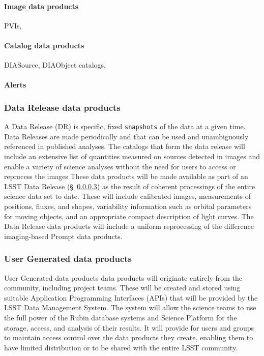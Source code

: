\paragraph {Image data products}  PVIs,
\paragraph {Catalog data products}  DIASource, DIAObject catalogs,
\paragraph {Alerts}


\subsubsection{Data Release data products} \label{sec:dp-release}
A Data Release (DR) is specific, fixed {\tt snapshots} of the data at a given time.
Data Releases are made periodically and that can be used and
unambiguously referenced in published analyses.
The catalogs that form the data release will include an extensive list of quantities measured on sources detected in images and
enable a variety of science analyses without the need for users to access or reprocess the images
These data products will be made available as part of an LSST Data Release (\S~\ref{}) as the result of coherent
processings of the entire science data set to date.
These will include calibrated images, measurements of positions, fluxes, and shapes,  variability information such as orbital
parameters for moving objects, and an appropriate compact description of light curves.
The Data Release data products will include a uniform reprocessing of the difference imaging-based Prompt data products.


\subsubsection{User Generated data products} \label{sec:dp-user}
User Generated data products data products will originate entirely from the community, including project teams.
These will be created and stored using suitable Application Programming Interfaces (APIs)
that will be provided by the LSST Data Management System.
The system will allow the science teams to use the full power of the Rubin database systems and
Science Platform for the storage, access, and analysis of their results.
It will provide for users and groups to maintain access control over the data products they create,
enabling them to have limited distribution or to be shared with the entire LSST community.

